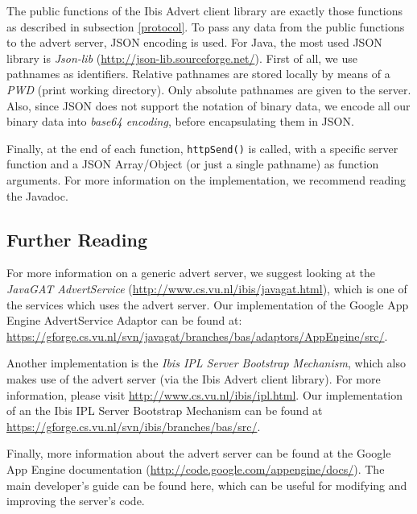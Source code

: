 The public functions of the Ibis Advert client library are exactly those
functions as described in subsection \ref{protocol}. To pass any data from the
public functions to the advert server, JSON encoding is used. For Java, the most
used JSON library is \emph{Json-lib} (\url{http://json-lib.sourceforge.net/}).
First of all, we use pathnames as identifiers. Relative pathnames are stored
locally by means of a \emph{PWD} (print working directory). Only absolute
pathnames are given to the server. Also, since JSON does not support the notation
of binary data, we encode all our binary data into \emph{base64 encoding}, before
encapsulating them in JSON.

Finally, at the end of each function, \texttt{httpSend()} is called, with a
specific server function and a JSON Array/Object (or just a single pathname) as
function arguments. For more information on the implementation, we recommend
reading the Javadoc.
 
\subsection{Further Reading}
\label{further}
For more information on a generic advert server, we suggest looking at the
\emph{JavaGAT AdvertService} (\url{http://www.cs.vu.nl/ibis/javagat.html}),
which is one of the services which uses the advert server. Our implementation
of the Google App Engine AdvertService Adaptor can be found at: 
\url{https://gforge.cs.vu.nl/svn/javagat/branches/bas/adaptors/AppEngine/src/}. 

Another implementation is the \emph{Ibis IPL Server Bootstrap Mechanism}, which
also makes use of the advert server (via the Ibis Advert client library). For more
information, please visit \url{http://www.cs.vu.nl/ibis/ipl.html}. Our
implementation of an the Ibis IPL Server Bootstrap Mechanism can be found at 
\url{https://gforge.cs.vu.nl/svn/ibis/branches/bas/src/}. 

Finally, more information about the advert server can be found at the Google
App Engine documentation (\url{http://code.google.com/appengine/docs/}). The
main developer's guide can be found here, which can be useful for modifying and
improving the server's code.
